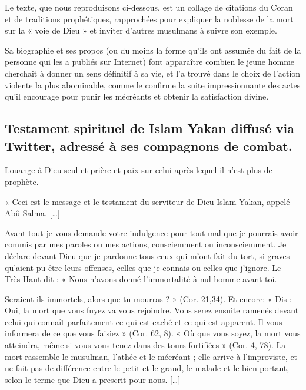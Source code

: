 Le texte, que nous reproduisons ci-dessous, est un collage de citations
du Coran et de traditions prophétiques, rapprochées pour expliquer la
noblesse de la mort sur la « voie de Dieu » et inviter d'autres
musulmans à suivre son exemple.

Sa biographie et ses propos (ou du moins la forme qu'ils ont assumée du
fait de la personne qui les a publiés sur Internet) font apparaître
combien le jeune homme cherchait à donner un sens définitif à sa vie, et
l'a trouvé dans le choix de l'action violente la plus abominable, comme
le confirme la suite impressionnante des actes qu'il encourage pour
punir les mécréants et obtenir la satisfaction divine.

\hypertarget{testament-spirituel-de-islam-yakan-diffusuxe9-via-twitter-adressuxe9-uxe0-ses-compagnons-de-combat.}{%
\subsection{Testament spirituel de Islam Yakan diffusé via Twitter, adressé
à ses compagnons de
combat.}\label{testament-spirituel-de-islam-yakan-diffusuxe9-via-twitter-adressuxe9-uxe0-ses-compagnons-de-combat.}}

Louange à Dieu seul et prière et paix sur celui après lequel il n'est
plus de prophète.

« Ceci est le message et le testament du serviteur de Dieu Islam Yakan,
appelé Abû Salma. {[}\ldots{]}

Avant tout je vous demande votre indulgence pour tout mal que je
pourrais avoir commis par mes paroles ou mes actions, consciemment ou
inconsciemment. Je déclare devant Dieu que je pardonne tous ceux qui
m'ont fait du tort, si graves qu'aient pu être leurs offenses, celles
que je connais ou celles que j'ignore. Le Très-Haut dit : « Nous n'avons
donné l'immortalité à nul homme avant toi.

Seraient-ils immortels, alors que tu mourras ? » (Cor. 21,34). Et
encore: « Dis : Oui, la mort que vous fuyez va vous rejoindre. Vous
serez ensuite ramenés devant celui qui connaît parfaitement ce qui est
caché et ce qui est apparent. Il vous informera de ce que vous faisiez »
(Cor. 62, 8). « Où que vous soyez, la mort vous atteindra, même si vous
vous tenez dans des tours fortifiées » (Cor. 4, 78). La mort rassemble
le musulman, l'athée et le mécréant ; elle arrive à l'improviste, et ne
fait pas de différence entre le petit et le grand, le malade et le bien
portant, selon le terme que Dieu a prescrit pour nous. {[}\ldots{]}

